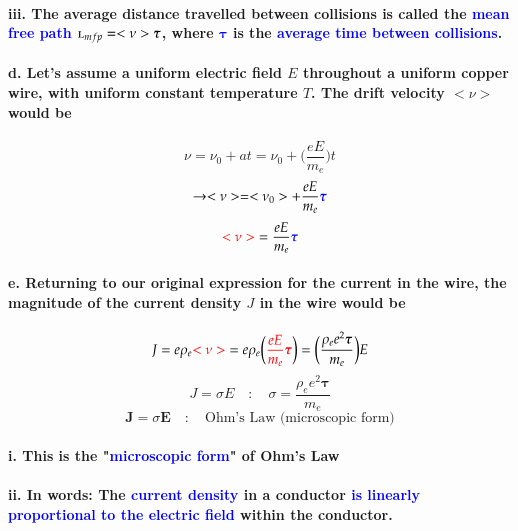 \documentclass{article}
\begin{document}
\paragraph{\indent\indent iii. The average distance travelled between collisions is called the \textcolor{blue}{mean free path} $\textsc{l}_{mfp}=<\nu>\boldsymbol{\tau}$, where \textcolor{blue}{$\boldsymbol{\tau}$} is the \textcolor{blue}{average time between collisions}.}
\paragraph{\indent d. Let's assume a uniform electric field $E$ throughout a uniform copper wire, with uniform constant temperature $T$. The drift velocity $<\nu>$ would be}
\begin{equation*}
    \nu=\nu_0+at=\nu_0+\bigg(\frac{eE}{m_e}\bigg)t
\end{equation*}
\begin{equation*}
    \rightarrow <\nu>=<\nu_0>+\frac{eE}{m_e}\textcolor{blue}{\boldsymbol{\tau}}
\end{equation*}
\begin{equation*}
    \textcolor{red}{<\nu>}=\frac{eE}{m_e}\textcolor{blue}{\boldsymbol{\tau}}
\end{equation*}
\paragraph{\indent e. Returning to our original expression for the current in the wire, the magnitude of the current density $J$ in the wire would be}
\begin{equation*}
    J=e\rho_e\textcolor{red}{<\nu>}=e\rho_e\bigg(\textcolor{red}{\frac{eE}{m_e}\boldsymbol{\tau}}\bigg)=\bigg(\frac{\rho_ee^2\boldsymbol{\tau}}{m_e}\bigg)E
\end{equation*}
\begin{equation*}
    J=\sigma E\quad:\quad \sigma=\frac{\rho_ee^2\boldsymbol{\tau}}{m_e}
\end{equation*}
\begin{equation*}
    \boldsymbol{J}=\sigma\boldsymbol{E}\quad :\quad\text{Ohm's Law (microscopic form)}
\end{equation*}
\paragraph{\indent\indent i. This is the "\textcolor{blue}{microscopic form}" of Ohm's Law}
\paragraph{\indent\indent ii. In words: The \textcolor{blue}{current density} in a conductor \textcolor{blue}{is linearly proportional to the electric field} within the conductor.}
\end{document}
